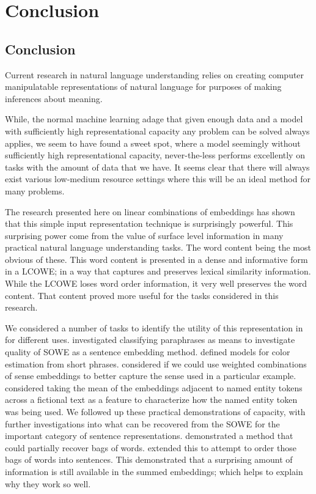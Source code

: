 \documentclass{book}
\begin{document}
\part{Conclusion}
\chapter{Conclusion}
Current research in natural language understanding relies on creating computer manipulatable representations of natural language for purposes of making inferences about meaning.


While, the normal machine learning adage that given enough data and a model with sufficiently high representational capacity any problem can be solved always applies,
we seem to have found a sweet spot, 
where a model seemingly without sufficiently high representational capacity,
never-the-less performs excellently on tasks with the amount of data that we have.
It seems clear that there will always exist various low-medium resource settings where this will be an ideal method for many problems.


The research presented here on linear combinations of embeddings has shown that this simple input representation technique is surprisingly powerful.
This surprising power come from the value of surface level information in many practical natural language understanding tasks.
The word content being the most obvious of these.
This word content is presented in a dense and informative form in a LCOWE; in a way that captures and preserves lexical similarity information.
While the LCOWE loses word order information, it very well preserves the word content.
That content proved more useful for the tasks considered in this research.


We considered a number of tasks to identify the utility of this representation in for different uses.
 investigated classifying paraphrases as means to investigate quality of SOWE as a sentence embedding method.
 defined models for color estimation from short phrases.
 considered if we could use weighted combinations of sense embeddings to better capture the sense used in a particular example.
 considered taking the mean of the embeddings adjacent to named entity tokens across a fictional text as a feature to characterize how the named entity token was being used.
We followed up these practical demonstrations of capacity,
with further investigations into what can be recovered from the SOWE for the important category of sentence representations.
 demonstrated a method that could partially recover bags of words.
 extended this to attempt to order those bags of words into sentences.
This demonstrated that a surprising amount of information is still available in the summed embeddings; which helps to explain why they work so well.
\end{document}
